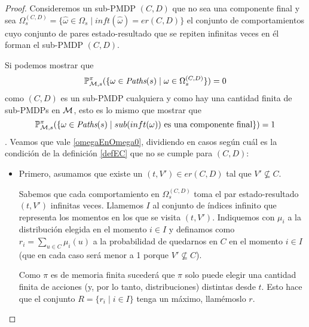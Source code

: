\begin{proof}
	Consideremos un sub-PMDP $(C,D)$ que no sea una componente final y sea $\Omega_s^{(C,D)} = \{\hat{\omega} \in \Omega_s \mid inft(\hat{\omega}) = er(C, D)\}$ el conjunto de comportamientos cuyo conjunto de pares estado-resultado que se repiten infinitas veces en él forman el sub-PMDP $(C,D)$.

	Si podemos mostrar que
	\begin{equation}\label{omegaEnOmega0}
		\mathbb{P}^\pi_{\mathcal{M}, s}(\{ \omega \in \textit{Paths}(s) \mid \omega \in \Omega_s^{(C,D)}\}) = 0
	\end{equation}
	como $(C,D)$ es un sub-PMDP cualquiera y como hay una cantidad finita de sub-PMDPs en $\mathcal{M}$, esto es lo mismo que mostrar que
	$$\mathbb{P}^\pi_{\mathcal{M}, s}(\{ \omega \in \textit{Paths}(s) \mid sub(inft(\omega)) \text{ es una componente final}\}) = 1$$.
	Veamos que vale \ref{omegaEnOmega0}, dividiendo en casos según cuál es la
	condición de la definición \ref{defEC} que no se cumple para $(C,D)$:

	\begin{itemize}
		\item Primero, asumamos que existe un $(t, V') \in er(C,D)$ tal que $V' \nsubseteq
			      C$.



		      Sabemos que cada comportamiento en $\Omega_s^{(C,D)}$ toma el par
		      estado-resultado $(t, V')$ infinitas veces. Llamemos $I$ al conjunto de índices
		      infinito que representa los momentos en los que se visita $(t, V')$. Indiquemos
		      con $\mu_i$ a la distribución elegida en el momento $i \in I$ y definamos como
		      $r_i = \sum_{u \in C} \mu_i(u)$ a la probabilidad de quedarnos en $C$ en el
		      momento $i \in I$ (que en cada caso será menor a 1 porque $V' \nsubseteq C$). %

		      Como $\pi$ es de memoria finita sucederá que $\pi$ solo puede elegir una
		      cantidad finita de acciones (y, por lo tanto, distribuciones) distintas desde
		      $t$. Esto hace que el conjunto $R = \{r_i \mid i \in I\}$ tenga un máximo,
		      llamémoslo $r$.


\end{itemize}
\end{proof}
